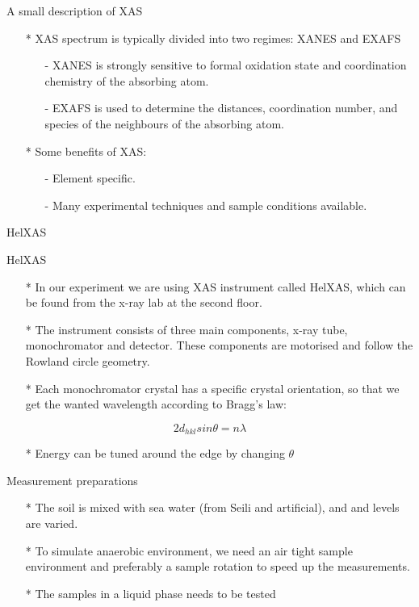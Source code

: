 \documentclass{beamer}
\begin{document}
  \begin{frame}{A small description of XAS}
  \begin{itemize}
    \item[*] XAS spectrum is typically divided into two regimes: XANES and EXAFS
    \begin{itemize}
      \item[-] XANES is strongly sensitive to formal oxidation state and coordination chemistry of the absorbing atom.
      \item[-] EXAFS is used to determine the distances, coordination number, and species of the neighbours of the absorbing atom.  
    \end{itemize}
    \item[*] Some benefits of XAS:
    \begin{itemize}
      \item[-] Element specific.
      \item[-] Many experimental techniques and sample conditions available.
    \end{itemize}
  \end{itemize}
  \end{frame}
  
  \begin{frame}{HelXAS}
  
  \end{frame}  
  
  \begin{frame}{HelXAS}
  \begin{itemize}
    \item[*] In our experiment we are using XAS instrument called HelXAS, which can be found from the x-ray lab at the second floor. 
    \item[*] The instrument consists of three main components, x-ray tube, monochromator and detector. These components are motorised and follow the Rowland circle geometry.
    \item[*] Each monochromator crystal has a specific crystal orientation, so that we get the wanted wavelength according to Bragg's law:   
  \end{itemize}
  \begin{equation}
  2d_{hkl}sin\theta=n\lambda
  \end{equation}
  \begin{itemize}
    \item[*] Energy can be tuned around the edge by changing $\theta$
  \end{itemize}
  \end{frame}
  \begin{frame}{Measurement preparations}
  \begin{itemize}
    \item[*] The soil is mixed with sea water (from Seili and artificial), and  and  levels are varied.
    \item[*] To simulate anaerobic environment, we need an air tight sample environment and preferably a sample rotation to speed up the measurements.
    \item[*] The samples in a liquid phase needs to be tested
  \end{itemize}
  \end{frame}
\end{document}
